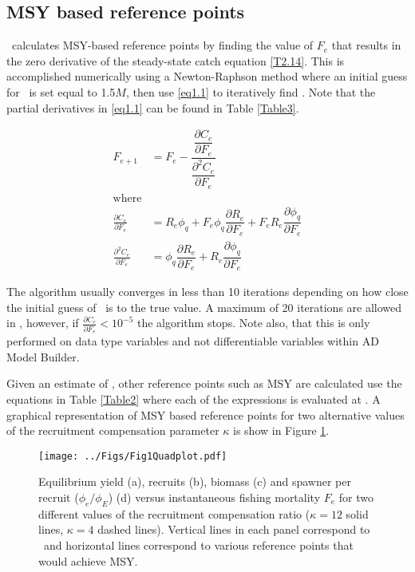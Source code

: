 \subsection{MSY based reference points}\label{sec:Finding_MSY}
\iscam\ calculates MSY-based reference points by finding the value of $F_e$ that results in the zero derivative of the steady-state catch equation \eqref{T2.14}.  This is accomplished numerically using a Newton-Raphson method where an initial guess for \fmsy\ is set equal to 1.5$M$, then use \eqref{eq1.1} to iteratively find \fmsy.  Note that the partial derivatives in \eqref{eq1.1} can be found in Table \ref{Table3}.

\begin{align}\label{eq1.1}
    F_{e+1}&=F_e - 
    \dfrac{ \dfrac{\partial C_e}{\partial F_e}}
    { \dfrac{\partial^2 C_e}{\partial F_e}}\\
    \mbox{where}\nonumber\\
     \frac{\partial C_e}{\partial F_e} &=
    R_e \phi_q
    + F_e \phi_q \dfrac{\partial R_e}{\partial F_e}
    + F_e R_e \dfrac{\partial \phi_q}{\partial F_e} \nonumber\\
    \frac{\partial^2 C_e}{\partial F_e} &=
    \phi_q \dfrac{\partial R_e}{\partial F_e}
   +  R_e \dfrac{\partial \phi_q}{\partial F_e}\nonumber
\end{align}

The algorithm usually converges in less than 10 iterations depending on how close the initial guess of \fmsy\ is to the true value.  A maximum of 20 iterations are allowed in \iscam, however, if $\frac{\partial C_e}{\partial F_e}<10^{-5}$ the algorithm stops.  Note also, that this is only performed on data type variables and not differentiable variables within AD Model Builder.

Given an estimate of \fmsy, other reference points such as MSY are calculated use the equations in Table \ref{Table2} where each of the expressions is evaluated at \fmsy.  A graphical representation of MSY based reference points for two alternative values of the recruitment compensation parameter $\kappa$ is show in Figure \ref{FigMSY}.

\begin{figure}[!tbp]
  \centering
  \texttt{[image: ../Figs/Fig1Quadplot.pdf]}\\
  \caption{Equilibrium yield (a), recruits (b), biomass (c) and
spawner per recruit ($\phi_e/\phi_E$) (d) versus instantaneous
fishing mortality $F_e$ for two different values of the recruitment
compensation ratio ($\kappa=12$ solid lines, $\kappa=4$ dashed
lines). Vertical lines in each panel correspond to \fmsy\ and
horizontal lines correspond to various reference points that would
achieve MSY.}\label{FigMSY}
\end{figure}

